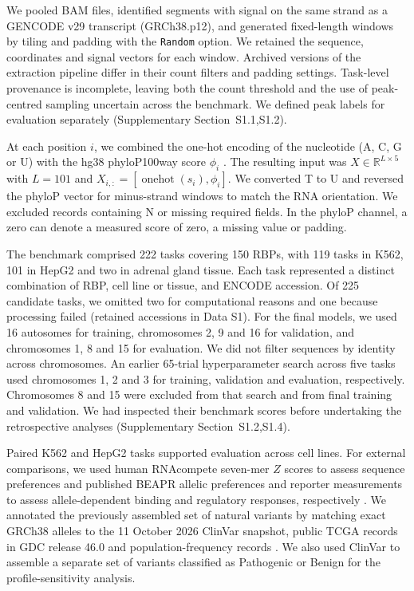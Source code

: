 \documentclass[webpdf,contemporary,large]{current_assets/oup-authoring-template}
\newcommand{\supsect}[1]{Supplementary Section~#1}
\begin{document}
We pooled BAM files, identified segments with signal on the same strand as a GENCODE v29 transcript (GRCh38.p12), and generated fixed-length windows by tiling and padding with the \texttt{Random} option. We retained the sequence, coordinates and signal vectors for each window. Archived versions of the extraction pipeline differ in their count filters and padding settings. Task-level provenance is incomplete, leaving both the count threshold and the use of peak-centred sampling uncertain across the benchmark. We defined peak labels for evaluation separately (\supsect{S1.1,S1.2}).

At each position $i$, we combined the one-hot encoding of the nucleotide (A, C, G or U) with the hg38 phyloP100way score $\phi_i$ \citep{pollard2010phylop}. The resulting input was $X\in\mathbb R^{L\times5}$ with $L=101$ and $X_{i,:}=[\operatorname{onehot}(s_i),\phi_i]$. We converted T to U and reversed the phyloP vector for minus-strand windows to match the RNA orientation. We excluded records containing N or missing required fields. In the phyloP channel, a zero can denote a measured score of zero, a missing value or padding.

The benchmark comprised 222 tasks covering 150 RBPs, with 119 tasks in K562, 101 in HepG2 and two in adrenal gland tissue. Each task represented a distinct combination of RBP, cell line or tissue, and ENCODE accession. Of 225 candidate tasks, we omitted two for computational reasons and one because processing failed (retained accessions in Data S1). For the final models, we used 16 autosomes for training, chromosomes 2, 9 and 16 for validation, and chromosomes 1, 8 and 15 for evaluation. We did not filter sequences by identity across chromosomes. An earlier 65-trial hyperparameter search across five tasks used chromosomes 1, 2 and 3 for training, validation and evaluation, respectively. Chromosomes 8 and 15 were excluded from that search and from final training and validation. We had inspected their benchmark scores before undertaking the retrospective analyses (\supsect{S1.2,S1.4}).

Paired K562 and HepG2 tasks supported evaluation across cell lines. For external comparisons, we used human RNAcompete seven-mer $Z$ scores to assess sequence preferences \citep{ray2013compendium} and published BEAPR allelic preferences and reporter measurements to assess allele-dependent binding and regulatory responses, respectively \citep{yang2019asb}. We annotated the previously assembled set of natural variants by matching exact GRCh38 alleles to the 11 October 2026 ClinVar snapshot, public TCGA records in GDC release 46.0 and population-frequency records \citep{landrum2018clinvar,grossman2016gdc}. We also used ClinVar to assemble a separate set of variants classified as Pathogenic or Benign for the profile-sensitivity analysis.
\end{document}
